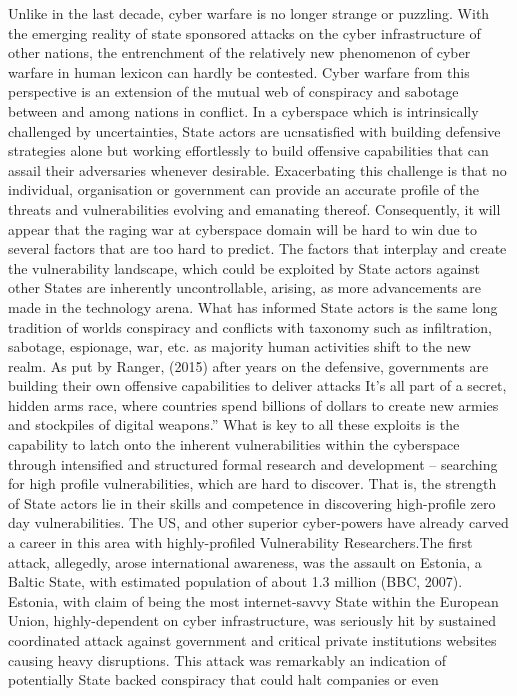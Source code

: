 \documentclass[11pt,a4paper]{article}
\begin{document}
	 Unlike in the last decade, cyber warfare is no longer strange or puzzling. With the emerging reality of state sponsored attacks on the cyber infrastructure of other nations, the entrenchment of the relatively new phenomenon of cyber warfare in human lexicon can hardly be contested. Cyber warfare from this perspective is an extension of the mutual web of conspiracy and sabotage between and among nations in conflict. In a cyberspace which is intrinsically challenged by uncertainties, State actors are ucnsatisfied with building defensive 
strategies alone but working effortlessly to build offensive capabilities that can assail their adversaries whenever desirable. Exacerbating this challenge is that no individual, organisation or government can provide an accurate 
profile of the threats and vulnerabilities evolving and emanating thereof. Consequently, it will appear that the raging war at cyberspace domain will be hard to win due to several factors that are too hard to predict. The 
factors that interplay and create the vulnerability landscape, which could be exploited by State actors against other States are inherently uncontrollable, arising, as more advancements are made in the technology arena. What 
has informed State actors is the same long tradition of worlds conspiracy and conflicts with taxonomy such as infiltration, sabotage, espionage, war, etc. as majority human activities shift to the new realm. As put by Ranger, 
(2015) after years on the defensive, governments are building their own offensive capabilities to deliver attacks It's all part of a secret, hidden arms race, where countries spend billions of dollars to create new armies 
and stockpiles of digital weapons.” What is key to all these exploits is the capability to latch onto the inherent vulnerabilities within the cyberspace through intensified and structured formal research and development –
searching for high profile vulnerabilities, which are hard to discover. That is, the strength of State actors lie in their skills and competence in discovering high-profile zero day vulnerabilities. The US, and other superior 
cyber-powers have already carved a career in this area with highly-profiled Vulnerability Researchers.The first attack, allegedly, arose international awareness, was the assault on Estonia, a Baltic State, with 
estimated population of about 1.3 million (BBC, 2007). Estonia, with claim of being the most internet-savvy State within the European Union, highly-dependent on cyber infrastructure, was seriously hit by sustained 
coordinated attack against government and critical private institutions websites causing heavy disruptions. This attack was remarkably an indication of potentially State backed conspiracy that could halt companies or even 
\end{document}
